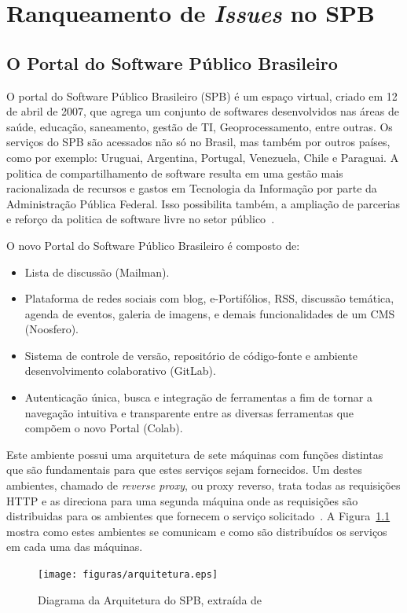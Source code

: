 \chapter{Ranqueamento de \textit{Issues} no SPB}
\label{est}
\section{O Portal do Software Público Brasileiro}
\label{est:sof}
O portal do Software Público Brasileiro (SPB) é um espaço virtual, criado em 12 de abril de 2007, que agrega um conjunto de softwares desenvolvidos nas áreas de saúde, educação, saneamento, gestão de TI, Geoprocessamento, entre outras. Os serviços do SPB são acessados não só no Brasil, mas também por outros países, como por exemplo: Uruguai, Argentina, Portugal, Venezuela, Chile e Paraguai. A politica de compartilhamento de software resulta em uma gestão mais racionalizada de recursos e gastos em Tecnologia da Informação por parte da Administração Pública Federal. Isso possibilita também, a ampliação de parcerias e reforço da politica de software livre no setor público~\cite{spb}.

O novo Portal do Software Público Brasileiro é composto de:

\begin{itemize}
    \item Lista de discussão (Mailman).
    \item Plataforma de redes sociais com blog, e-Portifólios, RSS, discussão 
    temática, agenda de eventos, galeria de imagens, e demais funcionalidades de um CMS (Noosfero).
    \item Sistema de controle de versão, repositório de código-fonte e ambiente 
    desenvolvimento colaborativo (GitLab).
    \item Autenticação única, busca e integração de ferramentas a fim de tornar 
    a navegação intuitiva e transparente entre as diversas ferramentas que compõem 
    o novo Portal (Colab).
\end{itemize}

Este ambiente possui uma arquitetura de sete máquinas com funções distintas que são fundamentais para que estes serviços sejam fornecidos. Um destes ambientes, chamado de \textit{reverse proxy}, ou proxy reverso,  trata todas as requisições HTTP e as direciona para uma segunda máquina onde as requisições são distribuidas para os ambientes que fornecem o serviço solicitado~\cite{spbdocs}. A Figura~\ref{fig:arquitetura} mostra como estes ambientes se comunicam e como são distribuídos os serviços em cada uma das máquinas.
\newpage
\begin{figure}[!h]
    \centering
        \texttt{[image: figuras/arquitetura.eps]}
    \caption{Diagrama da Arquitetura do SPB, extraída de~\cite{spbdocs}}
    \label{fig:arquitetura}
\end{figure}

